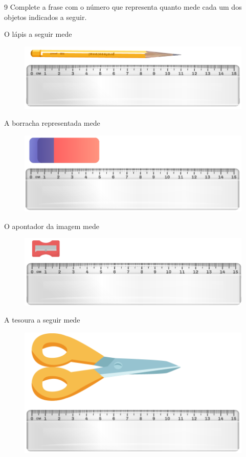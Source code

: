 \num{9} Complete a frase com o número que representa quanto mede cada um
dos objetos indicados a seguir.

\begin{escolha}
\item O lápis a seguir mede \reduline{11 cm\hfill}

\begin{figure}[htpb!]
\centering
\includegraphics[width=.6\textwidth]{../ilustracoes/MAT5/SAEB_5ANO_MAT_figura7.png}
\end{figure}

\pagebreak

\item A borracha representada mede \reduline{5 cm\hfill}

\begin{figure}[htpb!]
\centering
\includegraphics[width=.6\textwidth]{../ilustracoes/MAT5/SAEB_5ANO_MAT_figura8.png}
\end{figure}

\item O apontador da imagem mede \reduline{3 cm\hfill}

\begin{figure}[htpb!]
\centering
\includegraphics[width=.6\textwidth]{../ilustracoes/MAT5/SAEB_5ANO_MAT_figura9.png}
\end{figure}

\item A tesoura a seguir mede \reduline{10 cm\hfill}

\begin{figure}[htpb!]
\centering
\includegraphics[width=.6\textwidth]{../ilustracoes/MAT5/SAEB_5ANO_MAT_figura10.png}
\end{figure}

\end{escolha}

